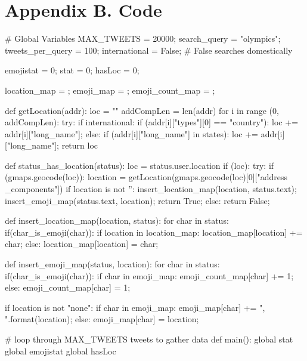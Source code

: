 \documentclass[a4paper,12pt]{article}
\begin{document}
\pagebreak
\section{Appendix B. Code}
\begin{python}
# Global Variables
MAX_TWEETS = 20000;
search_query = "olympics";
tweets_per_query = 100;
international = False;          # False searches domestically

emojistat = 0;
stat = 0;
hasLoc = 0;

location_map = {};
emoji_map = {};
emoji_count_map = {};

def getLocation(addr):
    loc = ""
    addCompLen = len(addr)
    for  i in range (0, addCompLen):
        try:
            if international:
                if (addr[i]["types"][0] == "country"):
                    loc += addr[i]["long_name"];
            else:
                if (addr[i]["long_name"] in states):
                    loc += addr[i]["long_name"];
    return loc

def status_has_location(status):
    loc = status.user.location
    if (loc):
        try:
            if (gmaps.geocode(loc)):
                location = getLocation(gmaps.geocode(loc)[0]["address
                _components"])
                if location is not '':
                    insert_location_map(location, status.text);
                    insert_emoji_map(status.text, location);
                    return True;
    else:
        return False;

def insert_location_map(location, status):
    for char in status:
        if(char_is_emoji(char)):
            if location in location_map:
                location_map[location] += char;
            else:
                location_map[location] = char;

def insert_emoji_map(status, location):
    for char in status:
        if(char_is_emoji(char)):
            if char in emoji_map:
                emoji_count_map[char] += 1;
            else:
                emoji_count_map[char] = 1;

            if location is not "none":
                if char in emoji_map:
                    emoji_map[char] += ", {}".format(location);
                else:
                    emoji_map[char] = location;

# loop through MAX_TWEETS tweets to gather data
def main():
    global stat
    global emojistat
    global hasLoc
    

\end{python}
\end{document}
